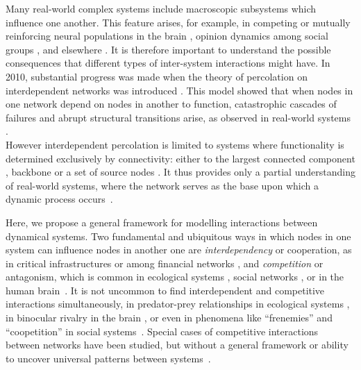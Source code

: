 \documentclass[pre,twocolumn,superscriptaddress]{revtex4}
\newcommand{\1}{\mathds{1}}
\begin{document}
Many real-world complex systems include macroscopic subsystems which influence one another.
This feature arises, for example, in competing or mutually reinforcing neural populations in the brain \cite{fox-pnas2005,stumpf-epl2010,misic-neuron2015}, opinion dynamics among social groups \cite{halu-epl2013}, and elsewhere \cite{angeli-pnas2004,helbing-nature2013}.
It is therefore important to understand the possible consequences that different types of inter-system interactions might have. 
In 2010, substantial progress was made when the theory of percolation on interdependent networks was introduced \cite{buldyrev-nature2010}.
This model showed that when nodes in one network depend on nodes in another to function, catastrophic cascades of failures and abrupt structural transitions arise, as observed in real-world systems \cite{buldyrev-nature2010,leichtdsouza2009,kivela-jcomnets2014,boccaletti-physicsreports2014,danziger-collection2016}.\\
\indent
However interdependent percolation is limited to systems where functionality is determined exclusively by connectivity: either to the largest connected component \cite{buldyrev-nature2010}, backbone \cite{danziger-newjphysics2015} or a set of source nodes \cite{min-pre2014}. It thus provides only a partial understanding of real-world systems, where the network serves as the base upon which a dynamic process occurs~\cite{boccaletti-physicsreports2002,barzel-naturephysics2013}.

Here, we propose a general framework for modelling interactions between dynamical systems.
Two fundamental and ubiquitous ways in which nodes in one system can influence nodes in another one are \textit{interdependency} or cooperation, as in critical infrastructures \cite{rosato-criticalinf2008,shekhtman-chaos2016,danziger-collection2016} or among financial networks \cite{kenett-mindsociety2015,brummitt-pre2015}, and \textit{competition} or antagonism, which is common in ecological systems \cite{hibbing-naturereviews2009,coyte-scienceadvances2015}, social networks \cite{halu-epl2013}, or in the human brain~\cite{fox-pnas2005,nicosia-prl2017}. 
It is not uncommon to find interdependent and competitive interactions simultaneously,  in predator-prey relationships in ecological systems \cite{blasius-nature1999}, in binocular rivalry in the brain \cite{fries-pnas1997}, or even in phenomena like ``frenemies'' and ``coopetition'' in social systems~\cite{lee-pubadmin2012}.
Special cases of  competitive interactions between networks have been studied, but without a general framework or ability to uncover universal patterns between systems~\cite{masuda-jtheoreticalbio2006,gomezgardenes-royalsocietya2015,valdez-jstatmech2016}.
\end{document}
